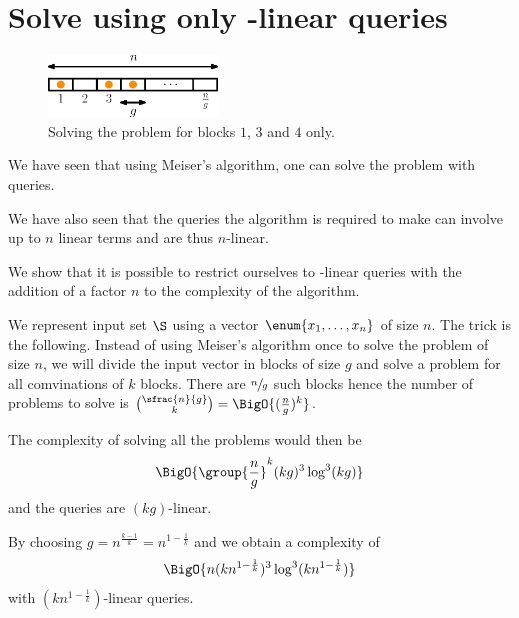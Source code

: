 \section{Solve \kSUM using only -linear queries}


\begin{figure}
\centering
\includegraphics[width=0.4\textwidth]{fig/point-location/blocks}
\caption{Solving the problem for blocks \(1\), \(3\) and \(4\) only.}
\label{fig:point-location:on:blocks}
\end{figure}

We have seen that using Meiser's algorithm, one can solve the \kSUM problem
with  queries.

We have also seen that the queries the algorithm is required to make can
involve up to \(n\) linear terms and are thus \(n\)-linear.

We show that it is possible to restrict ourselves to -linear queries
with the addition of a factor \(n\) to the complexity of the algorithm.

We represent input set \(\S\) using a vector \(\enum{x_1,\ldots,x_n}\) of size
\(n\). The trick is the following. Instead of using Meiser's algorithm once
to solve the problem of size \(n\), we will divide the input vector in blocks
of size \(g\) and solve a \kSUM problem for all comvinations of \(k\) blocks.
There are \(\sfrac{n}{g}\) such blocks hence the number of problems to solve is
\(\binom{\sfrac{n}{g}}{k} = \BigO{(\frac{n}{g})^k} \).

The complexity of solving all the problems would then be
\begin{displaymath}
\BigO{\group{\frac{n}{g}}^k (kg)^3 \log^3 (kg) }
\end{displaymath}
and the queries are \((kg)\)-linear.

By choosing \(g = n^{\frac{k-1}{k}} = n^{1-\frac{1}{k}}\) and we obtain a
complexity of
\begin{displaymath}
\BigO{n (kn^{1-\frac{1}{k}})^3 \log^3 (kn^{1-\frac{1}{k}}) }
\end{displaymath}
with \((kn^{1-\frac{1}{k}})\)-linear queries.

